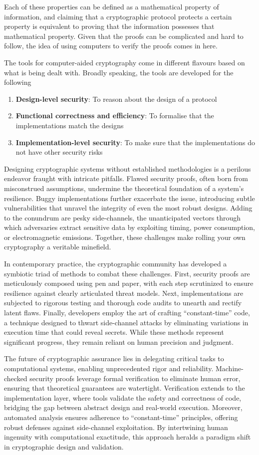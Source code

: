 Each of these properties can be defined as a mathematical property of information,
and claiming that a cryptographic protocol protects a certain property is equivalent to proving that the information possesses that mathematical property. Given that the proofs
can be complicated and hard to follow, the idea of using computers to verify the proofs comes in here.\par
The tools for computer-aided cryptography come in different flavours based on what
is being dealt with. Broadly speaking, the tools are developed for the following
\begin{enumerate}
	\item \textbf{Design-level security}: To reason about the design of a protocol
	\item \textbf{Functional correctness and efficiency}: To formalise that the implementations match the designs
	\item \textbf{Implementation-level security}: To make sure that the implementations do not have other security risks
\end{enumerate}
Designing cryptographic systems without established methodologies is a perilous endeavor fraught with intricate pitfalls. Flawed security proofs, often born from misconstrued assumptions, undermine the theoretical foundation of a system's resilience. Buggy implementations further exacerbate the issue, introducing subtle vulnerabilities that unravel the integrity of even the most robust designs. Adding to the conundrum are pesky side-channels, the unanticipated vectors through which adversaries extract sensitive data by exploiting timing, power consumption, or electromagnetic emissions. Together, these challenges make rolling your own cryptography a veritable minefield.\par
In contemporary practice, the cryptographic community has developed a symbiotic triad of methods to combat these challenges. First, security proofs are meticulously composed using pen and paper, with each step scrutinized to ensure resilience against clearly articulated threat models. Next, implementations are subjected to rigorous testing and thorough code audits to unearth and rectify latent flaws. Finally, developers employ the art of crafting ``constant-time'' code, a technique designed to thwart side-channel attacks by eliminating variations in execution time that could reveal secrets. While these methods represent significant progress, they remain reliant on human precision and judgment.\par
The future of cryptographic assurance lies in delegating critical tasks to computational systems, enabling unprecedented rigor and reliability. Machine-checked security proofs leverage formal verification to eliminate human error, ensuring that theoretical guarantees are watertight. Verification extends to the implementation layer, where tools validate the safety and correctness of code, bridging the gap between abstract design and real-world execution. Moreover, automated analysis ensures adherence to ``constant-time'' principles, offering robust defenses against side-channel exploitation. By intertwining human ingenuity with computational exactitude, this approach heralds a paradigm shift in cryptographic design and validation.
